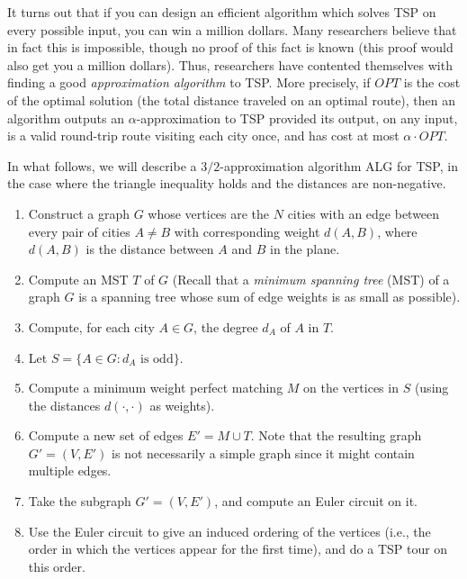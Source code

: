 \documentclass[12pt]{article}
\begin{document}


It turns out that if you can design an efficient algorithm which solves TSP on every possible input, you can win a million dollars. Many researchers believe that in fact this is impossible, though no proof of this fact is known (this proof would also get you a million dollars). Thus, researchers have contented themselves with finding a good {\it approximation algorithm} to TSP. More precisely, if $OPT$ is the cost of the optimal solution (the total distance traveled on an optimal route), then an algorithm outputs an $\alpha$-approximation to TSP provided its output, on any input, is a valid round-trip route visiting each city once, and has cost at most $\alpha \cdot OPT$.


In what follows, we will describe a $3/2$-approximation algorithm ALG for TSP, in the case where the triangle inequality holds and the distances are non-negative.

\begin{enumerate}
\item Construct a graph $G$ whose vertices are the $N$ cities with an edge between every pair of cities $A \neq B$ with corresponding weight $d(A,B)$, where $d(A,B)$ is the distance between $A$ and $B$ in the plane. 
\item Compute an MST $T$ of $G$ (Recall that a {\it minimum spanning tree} (MST) of a graph $G$ is a spanning tree whose sum of edge weights is as small as possible).
\item Compute, for each city $A \in G$, the degree $d_A$ of $A$ in $T$.
\item Let $S = \{ A \in G: d_A \mbox{ is odd}\}$.
\item Compute a minimum weight perfect matching $M$ on the vertices in
  $S$ (using the distances $d(\cdot, \cdot)$ as weights).
\item Compute a new set of edges $E' = M \cup T$. Note that the
  resulting graph $G' = (V, E')$ is not necessarily a simple graph
  since it might contain multiple edges.
\item Take the subgraph $G' = (V, E')$, and compute an Euler circuit on it.
\item Use the Euler circuit to give an induced ordering of the vertices (i.e., the order in which the vertices appear for the first time), and do a TSP tour on this order.
\end{enumerate}
\end{document}
